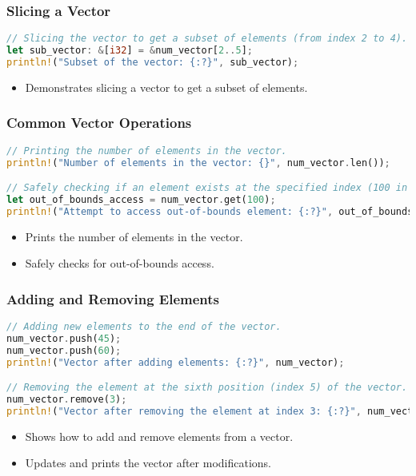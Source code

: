 \documentclass[aspectratio=169, table]{beamer}
\begin{document}
\begin{frame}[fragile]
\frametitle{Slicing a Vector}
\begin{lstlisting}[language=Rust]
// Slicing the vector to get a subset of elements (from index 2 to 4).
let sub_vector: &[i32] = &num_vector[2..5]; 
println!("Subset of the vector: {:?}", sub_vector);
\end{lstlisting}
\begin{itemize}
\item Demonstrates slicing a vector to get a subset of elements.
\end{itemize}
\end{frame}

\begin{frame}[fragile]
\frametitle{Common Vector Operations}
\begin{lstlisting}[language=Rust]
// Printing the number of elements in the vector.
println!("Number of elements in the vector: {}", num_vector.len());

// Safely checking if an element exists at the specified index (100 in this case).
let out_of_bounds_access = num_vector.get(100); 
println!("Attempt to access out-of-bounds element: {:?}", out_of_bounds_access);
\end{lstlisting}
\begin{itemize}
\item Prints the number of elements in the vector.
\item Safely checks for out-of-bounds access.
\end{itemize}
\end{frame}

\begin{frame}[fragile]
\frametitle{Adding and Removing Elements}
\begin{lstlisting}[language=Rust]
// Adding new elements to the end of the vector.
num_vector.push(45);
num_vector.push(60);
println!("Vector after adding elements: {:?}", num_vector);

// Removing the element at the sixth position (index 5) of the vector.
num_vector.remove(3); 
println!("Vector after removing the element at index 3: {:?}", num_vector);
\end{lstlisting}
\begin{itemize}
	\item Shows how to add and remove elements from a vector.
	\item Updates and prints the vector after modifications.
\end{itemize}
\end{frame}
\end{document}
